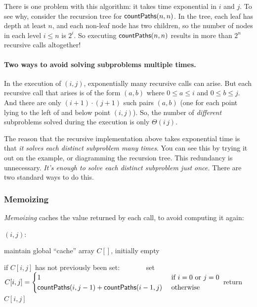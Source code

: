 \smallskip

There is one problem with this algorithm:
it takes time exponential in $i$ and $j$.
To see why, consider the recursion tree for $\textsf{countPaths}(n, n)$.
In the tree, each leaf has depth at least $n$,
and each non-leaf node has two children,
so the number of nodes in each level $i\le n$ is $2^i$.
So executing $\textsf{countPaths}(n,n)$ results in more than $2^n$ recursive calls altogether!

\paragraph{Two ways to avoid solving subproblems multiple times.}
In the execution of \countPaths$(i, j)$,
exponentially many recursive calls can arise.
But each recursive call that arises is of the form
\countPaths$(a, b)$ where $0\le a \le i$ and $0\le b\le j$.
And there are only $(i+1)\cdot (j+1)$ such pairs $(a,b)$
(one for each point lying to the left of and below point $(i, j)$).
So, the number of \emph{different} subproblems solved during the execution is only $\Theta(i\,j)$.

The reason that the recursive implementation above
takes exponential time is that \emph{it solves each distinct subproblem many times}.
You can see this by trying it out on the example,
or diagramming the recursion tree.
This redundancy is unnecessary.
\emph{It's enough to solve each distinct subproblem just once.}
There are two standard ways to do this.

\subsubsection{Memoizing}
\emph{Memoizing} caches the value returned by each call,
to avoid computing it again:

\smallskip 

\begin{myframed}
  \begin{steps}
  \item[]
    \countPaths$(i, j)$: 

    \step maintain global ``cache'' array $C[]$, initially empty \smallskip

    \step if $C[i,j]$ has not previously been set:
    \smallskip
    \step~~~~~~~set \(C[i, j] = \begin{cases}
      1 & \text{ if } i = 0 \text{ or } j = 0
      \\
      \textsf{countPaths}(i, j-1) + \textsf{countPaths}(i-1, j)
      & \text{ otherwise }
    \end{cases}
    \)
    \step return $C[i, j]$
  \end{steps}
\end{myframed}

